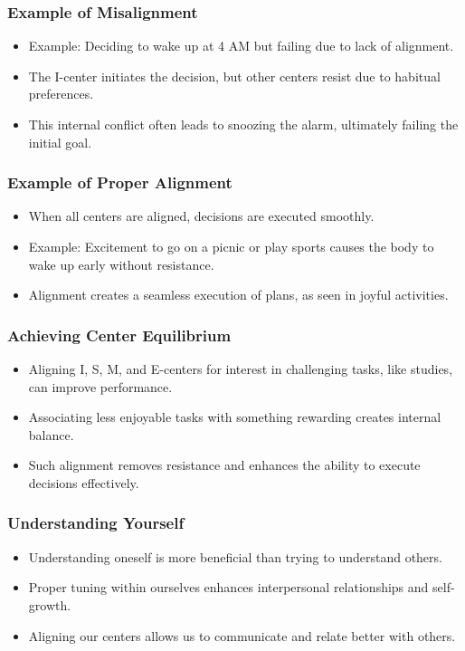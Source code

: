 \begin{frame}[fragile]\frametitle{Example of Misalignment}
    \begin{itemize}
        \item Example: Deciding to wake up at 4 AM but failing due to lack of alignment.
        \item The I-center initiates the decision, but other centers resist due to habitual preferences.
        \item This internal conflict often leads to snoozing the alarm, ultimately failing the initial goal.
    \end{itemize}
\end{frame}

\begin{frame}[fragile]\frametitle{Example of Proper Alignment}
    \begin{itemize}
        \item When all centers are aligned, decisions are executed smoothly.
        \item Example: Excitement to go on a picnic or play sports causes the body to wake up early without resistance.
        \item Alignment creates a seamless execution of plans, as seen in joyful activities.
    \end{itemize}
\end{frame}

\begin{frame}[fragile]\frametitle{Achieving Center Equilibrium}
    \begin{itemize}
        \item Aligning I, S, M, and E-centers for interest in challenging tasks, like studies, can improve performance.
        \item Associating less enjoyable tasks with something rewarding creates internal balance.
        \item Such alignment removes resistance and enhances the ability to execute decisions effectively.
    \end{itemize}
\end{frame}

\begin{frame}[fragile]\frametitle{Understanding Yourself}
    \begin{itemize}
        \item Understanding oneself is more beneficial than trying to understand others.
        \item Proper tuning within ourselves enhances interpersonal relationships and self-growth.
        \item Aligning our centers allows us to communicate and relate better with others.
    \end{itemize}
\end{frame}




